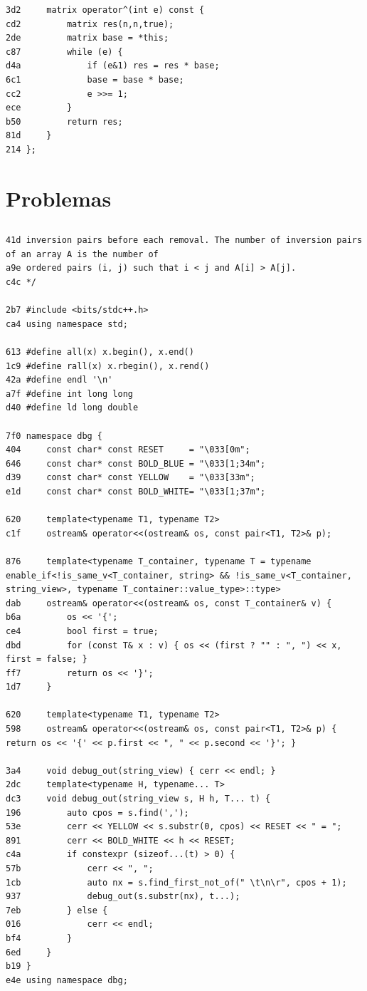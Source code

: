 \documentclass[11pt, a4paper, twoside]{article}
\begin{document}
{{\begin{lstlisting}
3d2     matrix operator^(int e) const {
cd2         matrix res(n,n,true);
2de         matrix base = *this;
c87         while (e) {
d4a             if (e&1) res = res * base;
6c1             base = base * base;
cc2             e >>= 1;
ece         }
b50         return res;
81d     }
214 };
\end{lstlisting}



%
%

\section{Problemas}

\subsection{}
\begin{lstlisting}
41d inversion pairs before each removal. The number of inversion pairs of an array A is the number of
a9e ordered pairs (i, j) such that i < j and A[i] > A[j].
c4c */

2b7 #include <bits/stdc++.h>
ca4 using namespace std;

613 #define all(x) x.begin(), x.end()
1c9 #define rall(x) x.rbegin(), x.rend()
42a #define endl '\n'
a7f #define int long long
d40 #define ld long double

7f0 namespace dbg {
404     const char* const RESET     = "\033[0m";
646     const char* const BOLD_BLUE = "\033[1;34m";
d39     const char* const YELLOW    = "\033[33m";
e1d     const char* const BOLD_WHITE= "\033[1;37m";
    
620     template<typename T1, typename T2>
c1f     ostream& operator<<(ostream& os, const pair<T1, T2>& p);
    
876     template<typename T_container, typename T = typename enable_if<!is_same_v<T_container, string> && !is_same_v<T_container, string_view>, typename T_container::value_type>::type>
dab     ostream& operator<<(ostream& os, const T_container& v) {
b6a         os << '{';
ce4         bool first = true;
dbd         for (const T& x : v) { os << (first ? "" : ", ") << x, first = false; }
ff7         return os << '}';
1d7     }
    
620     template<typename T1, typename T2>
598     ostream& operator<<(ostream& os, const pair<T1, T2>& p) { return os << '{' << p.first << ", " << p.second << '}'; }
    
3a4     void debug_out(string_view) { cerr << endl; }
2dc     template<typename H, typename... T>
dc3     void debug_out(string_view s, H h, T... t) {
196         auto cpos = s.find(',');
53e         cerr << YELLOW << s.substr(0, cpos) << RESET << " = ";
891         cerr << BOLD_WHITE << h << RESET;
c4a         if constexpr (sizeof...(t) > 0) {
57b             cerr << ", ";
1cb             auto nx = s.find_first_not_of(" \t\n\r", cpos + 1);
937             debug_out(s.substr(nx), t...);
7eb         } else {
016             cerr << endl;
bf4         }
6ed     }
b19 } 
e4e using namespace dbg;


\end{lstlisting}}}
\end{document}
